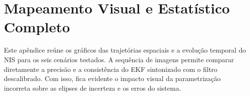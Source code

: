 \section{Mapeamento Visual e Estatístico Completo}
\label{app:graficos_completos}

Este apêndice reúne os gráficos das trajetórias espaciais e a evolução temporal do NIS para os seis cenários testados. 
A sequência de imagens permite comparar diretamente a precisão e a consistência do EKF sintonizado com o filtro descalibrado.
Com isso, fica evidente o impacto visual da parametrização incorreta sobre as elipses de incerteza e os erros do sistema.

